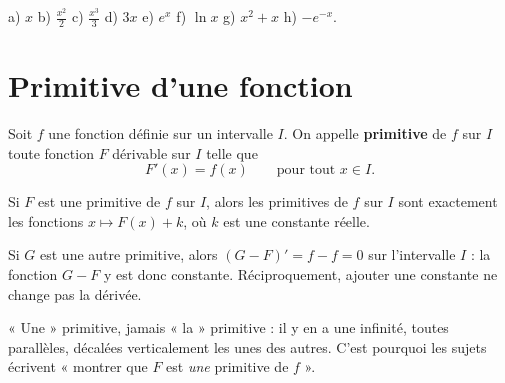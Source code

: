 \begin{corrige}[automatismes]
a) $x$ \quad b) $\frac{x^{2}}{2}$ \quad c) $\frac{x^{3}}{3}$ \quad d) $3x$
\quad e) $e^{x}$ \quad f) $\ln x$ \quad g) $x^{2}+x$ \quad h) $-e^{-x}$.
\end{corrige}

\section{Primitive d'une fonction}

\begin{definition}[primitive]
Soit $f$ une fonction définie sur un intervalle $I$. On appelle
\textbf{primitive} de $f$ sur $I$ toute fonction $F$ dérivable sur $I$ telle
que
\[
  F'(x) = f(x) \qquad \text{pour tout } x \in I .
\]
\end{definition}

\begin{theoreme}
Si $F$ est une primitive de $f$ sur $I$, alors les primitives de $f$ sur $I$
sont exactement les fonctions $x \mapsto F(x)+k$, où $k$ est une constante
réelle.
\end{theoreme}

\begin{demonstration}
Si $G$ est une autre primitive, alors $(G-F)' = f-f = 0$ sur l'intervalle
$I$ : la fonction $G-F$ y est donc constante. Réciproquement, ajouter une
constante ne change pas la dérivée.
\end{demonstration}

\begin{remarque}
« Une » primitive, jamais « la » primitive : il y en a une infinité, toutes
parallèles, décalées verticalement les unes des autres. C'est pourquoi les
sujets écrivent « montrer que $F$ est \emph{une} primitive de $f$ ».
\end{remarque}

